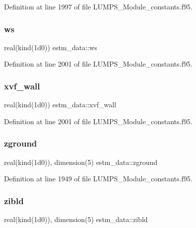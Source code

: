 Definition at line 1997 of file L\+U\+M\+P\+S\+\_\+\+Module\+\_\+constants.\+f95.

\mbox{\label{namespaceestm__data_afbfac6ece52d6f190b854a3d3dd59631}} 
\subsubsection{\texorpdfstring{ws}{ws}}
{\footnotesize\ttfamily real(kind(1d0)) estm\+\_\+data\+::ws}



Definition at line 2001 of file L\+U\+M\+P\+S\+\_\+\+Module\+\_\+constants.\+f95.

\mbox{\label{namespaceestm__data_aea93574cedba3c739a606830f554c1c8}} 
\subsubsection{\texorpdfstring{xvf\+\_\+wall}{xvf\_wall}}
{\footnotesize\ttfamily real(kind(1d0)) estm\+\_\+data\+::xvf\+\_\+wall}



Definition at line 2001 of file L\+U\+M\+P\+S\+\_\+\+Module\+\_\+constants.\+f95.

\mbox{\label{namespaceestm__data_a0cf74171fd4626303e99a6ef657ae1c3}} 
\subsubsection{\texorpdfstring{zground}{zground}}
{\footnotesize\ttfamily real(kind(1d0)), dimension(5) estm\+\_\+data\+::zground}



Definition at line 1949 of file L\+U\+M\+P\+S\+\_\+\+Module\+\_\+constants.\+f95.

\mbox{\label{namespaceestm__data_a6268c5a8d9d7a6835ad2906f53730588}} 
\subsubsection{\texorpdfstring{zibld}{zibld}}
{\footnotesize\ttfamily real(kind(1d0)), dimension(5) estm\+\_\+data\+::zibld}



